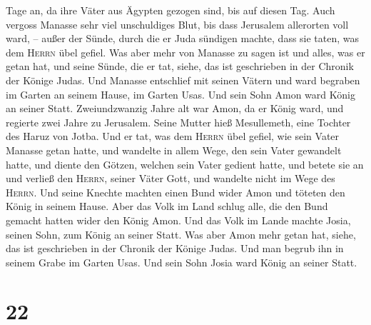 Tage an, da ihre Väter aus Ägypten gezogen sind, bis auf diesen Tag.
 Auch vergoss Manasse sehr viel unschuldiges Blut, bis
dass Jerusalem allerorten voll ward, -- außer der Sünde, durch die er
Juda sündigen machte, dass sie taten, was dem \textsc{Herrn} übel
gefiel.  Was aber mehr von Manasse zu sagen ist und
alles, was er getan hat, und seine Sünde, die er tat, siehe, das ist
geschrieben in der Chronik der Könige Judas.  Und Manasse
entschlief mit seinen Vätern und ward begraben im Garten an seinem
Hause, im Garten Usas. Und sein Sohn Amon ward König an seiner Statt.
 Zweiundzwanzig Jahre alt war Amon, da er König ward, und
regierte zwei Jahre zu Jerusalem. Seine Mutter hieß Mesullemeth, eine
Tochter des Haruz von Jotba.  Und er tat, was dem
\textsc{Herrn} übel gefiel, wie sein Vater Manasse getan hatte,
 und wandelte in allem Wege, den sein Vater gewandelt
hatte, und diente den Götzen, welchen sein Vater gedient hatte, und
betete sie an  und verließ den \textsc{Herrn}, seiner
Väter Gott, und wandelte nicht im Wege des \textsc{Herrn}.
 Und seine Knechte machten einen Bund wider Amon und
töteten den König in seinem Hause.  Aber das Volk im Land
schlug alle, die den Bund gemacht hatten wider den König Amon. Und das
Volk im Lande machte Josia, seinen Sohn, zum König an seiner Statt.
 Was aber Amon mehr getan hat, siehe, das ist geschrieben
in der Chronik der Könige Judas.  Und man begrub ihn in
seinem Grabe im Garten Usas. Und sein Sohn Josia ward König an seiner
Statt.

\hypertarget{section-21}{%
\section{22}\label{section-21}}

